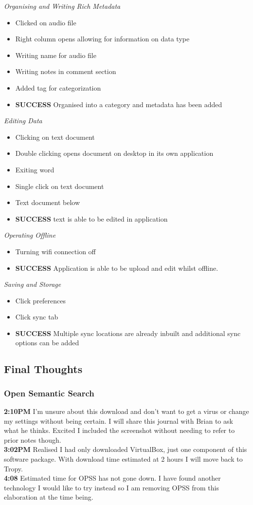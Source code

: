 \documentclass{article}
\begin{document}
\textit{Organising and Writing Rich Metadata}
\begin{itemize}
\item Clicked on audio file
\item Right column opens allowing for information on data type
\item Writing name for audio file
\item Writing notes in comment section
\item Added tag for categorization
\item \textbf{SUCCESS} Organised into a category and metadata has been added
\end{itemize}

\textit{Editing Data}
\begin{itemize}
\item Clicking on text document 
\item Double clicking opens document on desktop in its own application
\item Exiting word
\item Single click on text document
\item Text document below
\item \textbf{SUCCESS} text is able to be edited in application
\end{itemize}

\textit{Operating Offline}
\begin{itemize}
\item Turning wifi connection off
\item \textbf{SUCCESS} Application is able to be upload and edit whilst offline.
\end{itemize}

\textit{Saving and Storage}
\begin{itemize}
\item Click preferences
\item Click sync tab
\item \textbf{SUCCESS} Multiple sync locations are already inbuilt and additional sync options can be added
\end{itemize}


\subsection{Final Thoughts}
\subsubsection{Open Semantic Search}
\textbf{2:10PM} I'm unsure about this download and don't want to get a virus or change my settings without being certain. I will share this journal with Brian to ask what he thinks. Excited I included the screenshot without needing to refer to prior notes though. \\
\textbf{3:02PM} Realised I had only downloaded VirtualBox, just one component of this software package. With download time estimated at 2 hours I will move back to Tropy. \\
\textbf{4:08} Estimated time for OPSS has not gone down. I have found another technology I would like to try instead so I am removing OPSS from this elaboration at the time being. 
\end{document}
